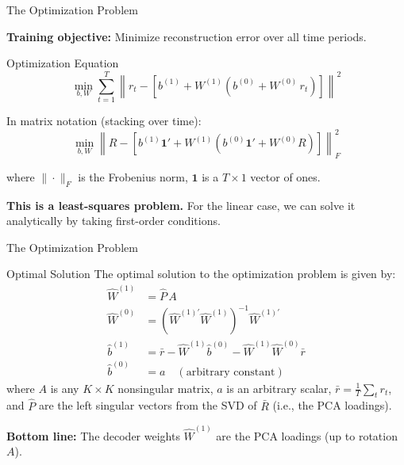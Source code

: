 \documentclass[aspectratio=169]{beamer}
\begin{document}
%
%
\begin{frame}{The Optimization Problem}

\textbf{Training objective:} Minimize reconstruction error over all time periods.

\begin{block}{Optimization Equation}
\vspace{0.5em}
\[
\min_{b, W} \sum_{t=1}^{T} \left\| r_t - \left[ b^{(1)} + W^{(1)}\!\left(b^{(0)} + W^{(0)}\, r_t\right) \right] \right\|^2
\]
\vspace{0.5em}
\end{block}

In matrix notation (stacking over time):
\[
\min_{b, W} \left\| R - \left[ b^{(1)}\bm{1}' + W^{(1)}\!\left(b^{(0)}\bm{1}' + W^{(0)} R\right) \right] \right\|_F^2
\]

where $\|\cdot\|_F$ is the Frobenius norm, $\bm{1}$ is a $T \times 1$ vector of ones.

\vspace{0.5em}
\textbf{This is a least-squares problem.} For the linear case, we can solve it analytically by taking first-order conditions.
\end{frame}
%
%
\begin{frame}{The Optimization Problem}

\begin{block}{Optimal Solution}
The optimal solution to the optimization problem is given by:
\begin{align}
\hat{W}^{(1)} &= \hat{P}\, A \tag{i}\\[4pt]
\hat{W}^{(0)} &= \left(\hat{W}^{(1)\prime}\hat{W}^{(1)}\right)^{-1}\hat{W}^{(1)\prime} \tag{ii}\\[4pt]
\hat{b}^{(1)} &= \bar{r} - \hat{W}^{(1)}\hat{b}^{(0)} - \hat{W}^{(1)}\hat{W}^{(0)}\bar{r} \tag{iii}\\[4pt]
\hat{b}^{(0)} &= a \quad (\text{arbitrary constant}) \tag{iv}
\end{align}
where $A$ is any $K \times K$ nonsingular matrix, $a$ is an arbitrary scalar, $\bar{r} = \frac{1}{T}\sum_t r_t$, and $\hat{P}$ are the left singular vectors from the SVD of $\bar{R}$ (i.e., the PCA loadings).
\end{block}

\vspace{0.3em}
\textbf{Bottom line:} The decoder weights $\hat{W}^{(1)}$ are the PCA loadings (up to rotation $A$).
\end{frame}
\end{document}
